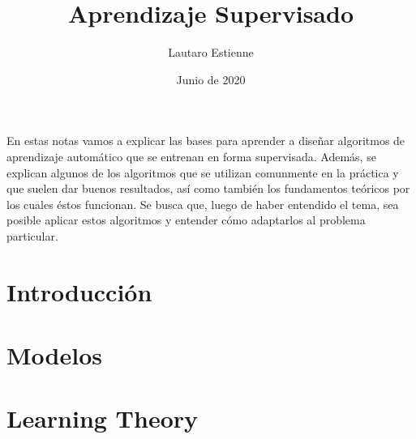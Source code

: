 \documentclass[12pt]{article}
\title{\LARGE \textbf{Aprendizaje Supervisado}}
\author{Lautaro Estienne}
\date{Junio de 2020}
\begin{document}


\maketitle

En estas notas vamos a explicar las bases para aprender a diseñar algoritmos de aprendizaje automático que se entrenan en forma supervisada. Además, se explican algunos de los algoritmos que se utilizan comunmente en la práctica y que suelen dar buenos resultados, así como también los fundamentos teóricos por los cuales éstos funcionan. Se busca que, luego de haber entendido el tema, sea posible aplicar estos algoritmos y entender cómo adaptarlos al problema particular. 

\section{Introducción}


\section{Modelos}


\section{Learning Theory}

\end{document}
